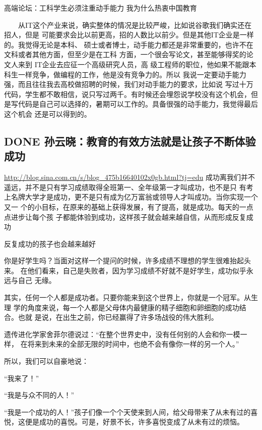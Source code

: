 \documentclass[11pt]{ctexart}
\begin{document}
{{{{高端论坛：工科学生必须注重动手能力
我为什么热衷中国教育

　　从IT这个产业来说，确实整体的情况是比较严峻，比如说谷歌我们确实还在招人，但是
可能要求会比以前更高，招的人数比以前少。但是其他IT企业是一样的。我觉得无论是本科、
硕士或者博士，动手能力都还是非常重要的，也许不在文科或者其他方面，但至少是在工科
方面，一个很会写论文，甚至能够得奖的论文人来到 IT企业去应征一个高级研究人员，高
级工程师的职位，他如果不能跟本科生一样竞争，做编程的工作，他是没有竞争力的。所以
我说一定要动手能力强，而且往往我去高校做招聘的时候，我们对动手能力的要求，比如说
写过十万代码，学生都不敢相信，说只写过两千。有时候还会埋怨说学校没有这个机会，但
是写代码是自己可以选择的，暑期可以工作的。具备很强的动手能力，我觉得最后这个机会
还是可以得到的。

\subsection{{\bfseries\sffamily DONE} 孙云晓：教育的有效方法就是让孩子不断体验成功}
\label{sec:org515bbbb}
\url{http://blog.sina.com.cn/s/blog\_475b16640102x0gb.html?tj=edu}
成功离我们并不遥远，并不是只有学习成绩取得全班第一、全年级第一才叫成功，也不是只
有考上名牌大学才是成功，更不是只有成为亿万富翁或领导人才叫成功。当你实现一个又一
个的小目标，在原来的基础上获得发展，有了提高，就是成功。每天的一点点进步让每个孩
子都能体验到成功，这样孩子就会越来越自信，从而形成反复成功




反复成功的孩子也会越来越好

你是好学生吗？当面对这样一个提问的时候，许多成绩不理想的学生很难抬起头来。
在他们看来，自己是失败者，因为学习成绩不好就不是好学生，成功似乎永远与自己
无缘。


其实，任何一个人都是成功者。只要你能来到这个世界上，你就是一个冠军。从生理
学的角度来说，每一个人都是父母体内最健康的精子细胞和卵细胞的成功结合。也就
是说，在出生之前，你已经赢得了许多场战役的伟大胜利。


遗传进化学家舍菲尔德说过：“在整个世界史中，没有任何别的人会和你一模一样，
在将来到未来的全部无限的时间中，也绝不会有像你一样的另一个人。”


所以，我们可以自豪地说：

“我来了！”

“我是与众不同的人！”

“我是一个成功的人！”孩子们像一个个天使来到人间，给父母带来了从未有过的喜
悦，这便是成功的喜悦。可是，好景不长，许多喜悦变成了从未有过的烦恼。




}}}}
\end{document}
